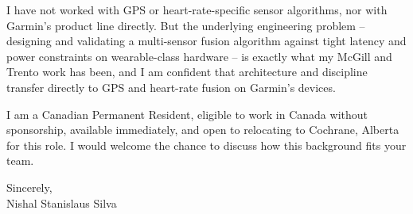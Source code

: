\documentclass[11pt]{article}
\begin{document}
\vspace{0.5em}
\noindent I have not worked with GPS or heart-rate-specific sensor algorithms, nor with Garmin's product line directly. But the underlying engineering problem -- designing and validating a multi-sensor fusion algorithm against tight latency and power constraints on wearable-class hardware -- is exactly what my McGill and Trento work has been, and I am confident that architecture and discipline transfer directly to GPS and heart-rate fusion on Garmin's devices.

\vspace{0.5em}
\noindent I am a Canadian Permanent Resident, eligible to work in Canada without sponsorship, available immediately, and open to relocating to Cochrane, Alberta for this role. I would welcome the chance to discuss how this background fits your team.

\vspace{1em}
\noindent Sincerely, \\
Nishal Stanislaus Silva
\end{document}

